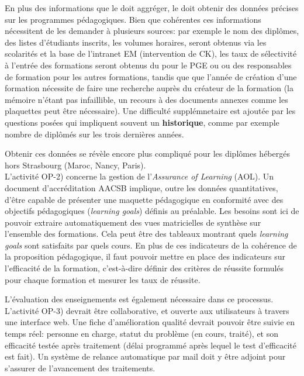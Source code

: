 \documentclass{book}
\begin{document}
En plus des informations que le \scom doit aggréger, le \sop doit obtenir des 
données précises sur les programmes pédagogiques. Bien que cohérentes ces 
informations nécessitent de les demander à plusieurs sources: par exemple
le nom des diplômes, des listes d'étudiants inscrits, les volumes horaires,
seront obtenus via les scolarités et la base de l'intranet EM (intervention de 
CK), les taux de sélectivité à l'entrée des formations seront obtenus du \sconc 
pour le PGE ou ou des responsables de formation pour les autres formations, 
tandis que que l'année de création d'une formation nécessite
de faire une recherche auprès du créateur de la formation (la mémoire n'étant
pas infaillible, un recours à des documents annexes comme les plaquettes peut
être nécessaire).
Une difficulté supplémnetaire est ajoutée par les questions posées qui impliquent
souvent un \textbf{historique}, comme par exemple nombre de diplômés sur les trois
dernières années.

Obtenir ces données se révèle encore plus compliqué pour les diplômes hébergés
hors Strasbourg (Maroc, Nancy, Paris).\\


L'activité OP-2) concerne la gestion de l'\emph{Assurance of Learning} (AOL).
Un document d'accréditation AACSB implique, outre les données quantitatives,
d'être capable de présenter une maquette pédagogique en conformité avec des
objectifs pédagogiques (\emph{learning goals}) définis au préalable. 
Les besoins sont ici de pouvoir extraire automatiquement des vues matricielles
de synthèse sur l'ensemble des formations. Cela peut être des tableaux montrant
quels \emph{learning goals} sont satisfaits par quels cours. 
En plus de ces indicateurs de la cohérence de la proposition pédagogique, il
faut pouvoir mettre en place des indicateurs sur l'efficacité de la formation,
c'est-à-dire définir des critères de réussite formulés pour chaque formation
et mesurer les taux de réussite.

L'évaluation des enseignements est également nécessaire dans ce processus.\\

L'activité OP-3) devrait être collaborative, et ouverte aux utilisateurs à 
travers une interface web. Une fiche d'amélioration qualité devrait pouvoir
être suivie en temps réel: personne en charge, statut du problème (en cours, 
traité), et son efficacité testée après traitement (délai programmé après 
lequel le test d'efficacité est fait). Un système de relance automatique
par mail doit y être adjoint pour s'assurer de l'avancement des traitements.
\end{document}
